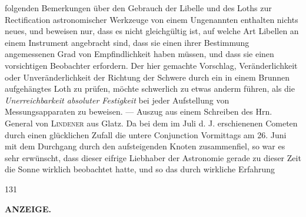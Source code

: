 folgenden Bemerkungen über den Gebrauch der Libelle und des Loths zur Rectification astronomischer Werkzeuge von einem Ungenannten enthalten nichts neues, und beweisen nur, dass es nicht gleichgültig ist, auf welche Art Libellen an einem Instrument angebracht sind, dass sie einen ihrer Bestimmung angemessenen Grad von Empfindlichkeit haben müssen, und dass sie einen vorsichtigen Beobachter erfordern. Der hier gemachte Vorschlag, Veränderlichkeit oder Unveränderlichkeit der Richtung der Schwere durch ein in einem Brunnen aufgehängtes Loth zu prüfen, möchte schwerlich zu etwas anderm führen, als die \emph{Unerreichbarkeit absoluter Festigkeit} bei jeder Aufstellung von Messungsapparaten zu beweisen. --- Auszug aus einem Schreiben des Hrn. General von \textsc{Lindener} aus Glatz. Da bei dem im Juli d. J. erschienenen Cometen durch einen glücklichen Zufall die untere Conjunction Vormittags am 26. Juni mit dem Durchgang durch den aufsteigenden Knoten zusammenfiel, so war es sehr erwünscht, dass dieser eifrige Liebhaber der Astronomie gerade zu dieser Zeit die Sonne wirklich beobachtet hatte, und so das durch wirkliche Erfahrung\par
\vfill
{}\hfill{\small 131}\hspace*{.18\textwidth}\par
\clearpage
{}
\noindent{}%
\parbox[b]{\dimexpr\textwidth-20mm\relax}{\centering\small\textbf{ANZEIGE.}}%
\makebox[10mm][r]{}\par\nobreak\medskip
